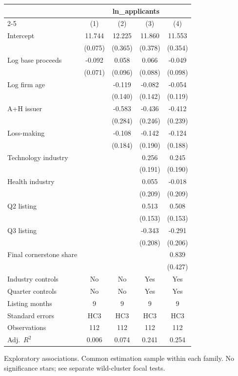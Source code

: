 \begin{table}[!htbp]\centering
\begin{tabular}{lcccc}
\toprule
 & \multicolumn{4}{c}{ln\_applicants} \\
\cmidrule(lr){2-5}
 & (1) & (2) & (3) & (4) \\
\midrule
Intercept & 11.744 & 12.225 & 11.860 & 11.553 \\
 & (0.075) & (0.365) & (0.378) & (0.354) \\
Log base proceeds & -0.092 & 0.058 & 0.066 & -0.049 \\
 & (0.071) & (0.096) & (0.088) & (0.098) \\
Log firm age &  & -0.119 & -0.082 & -0.054 \\
 &  & (0.140) & (0.142) & (0.119) \\
A+H issuer &  & -0.583 & -0.436 & -0.412 \\
 &  & (0.284) & (0.246) & (0.239) \\
Loss-making &  & -0.108 & -0.142 & -0.124 \\
 &  & (0.184) & (0.190) & (0.188) \\
Technology industry &  &  & 0.256 & 0.245 \\
 &  &  & (0.191) & (0.190) \\
Health industry &  &  & 0.055 & -0.018 \\
 &  &  & (0.209) & (0.209) \\
Q2 listing &  &  & 0.513 & 0.508 \\
 &  &  & (0.153) & (0.153) \\
Q3 listing &  &  & -0.343 & -0.291 \\
 &  &  & (0.208) & (0.206) \\
Final cornerstone share &  &  &  & 0.839 \\
 &  &  &  & (0.427) \\
\midrule
Industry controls & No & No & Yes & Yes \\
Quarter controls & No & No & Yes & Yes \\
Listing months & 9 & 9 & 9 & 9 \\
Standard errors & HC3 & HC3 & HC3 & HC3 \\
Observations & 112 & 112 & 112 & 112 \\
Adj.\ $R^2$ & 0.006 & 0.074 & 0.241 & 0.254 \\
\bottomrule
\end{tabular}
\par\vspace{2pt}\begin{minipage}{0.95\linewidth}\footnotesize Exploratory associations. Common estimation sample within each family. No significance stars; see separate wild-cluster focal tests.\end{minipage}
\end{table}